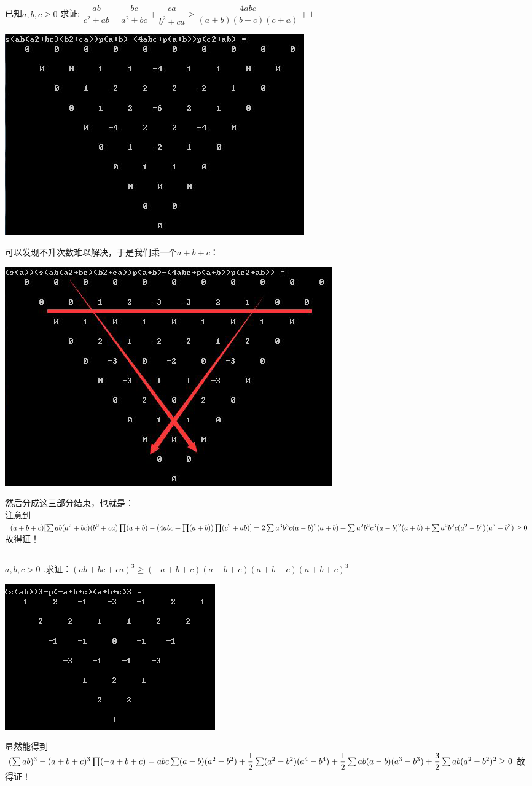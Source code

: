 \documentclass[UTF8]{ctexart}
\begin{document}
\subsection{}
已知$  a, b, c \geq 0 $ 求证:
$ \dfrac{a b}{c^{2}+a b}+\dfrac{b c}{a^{2}+b c}+\dfrac{c a}{b^{2}+c a} \geq \dfrac{4 a b c}{(a+b)(b+c)(c+a)}+1 $
\begin{center}
	\includegraphics[width=0.5\linewidth]{a31}
\end{center}
可以发现不升次数难以解决，于是我们乘一个$ a+b+c $：
\begin{center}
	\includegraphics[width=0.5\linewidth]{a32}
\end{center}
然后分成这三部分结束，也就是：\\
注意到$ (a+b+c)[\sum ab(a^{2}+bc)(b^{2}+ca)\prod (a+b)-(4abc+\prod (a+b))\prod (c^{2}+ab)]=\\
2\sum a^{3}b^{3}c(a-b)^{2}(a+b)+\sum  a^{2}b^{2}c^{3}(a-b)^{2}(a+b)+\sum a^{2}b^{2}c(a^{2}-b^{2})(a^{3}-b^{3})\ge 0 $故得证！
\subsection{}
 $ a, b, c>0 $ .求证：$ (a b+b c+c a)^{3} \geq(-a+b+c)(a-b+c)(a+b-c)(a+b+c)^{3} $
\begin{center}
	\includegraphics[width=0.5\linewidth]{a33}
\end{center}
显然能得到$ (\sum ab)^3-(a+b+c)^3\prod (-a+b+c)=\\
abc\sum (a-b)(a^2-b^2)+\dfrac{1}{2} \sum (a^2-b^2)(a^4-b^4)+\dfrac{1}{2} \sum ab(a-b)(a^3-b^3)+\dfrac{3}{2}\sum ab(a^2-b^2)^2 \ge 0 $故得证！
\end{document}
